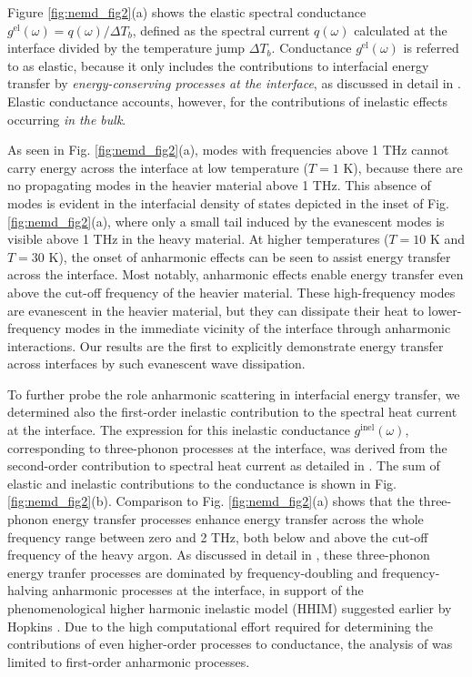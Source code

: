 
Figure \ref{fig:nemd_fig2}(a) shows the elastic spectral conductance $g^{\textrm{el}}(\omega)=q(\omega)/\Delta T_b$, defined as the spectral current $q(\omega)$ calculated at the interface divided by the temperature jump $\Delta T_b$. Conductance $g^{\textrm{el}}(\omega)$ is referred to as elastic, because it only includes the contributions to interfacial energy transfer by \textit{energy-conserving processes at the interface}, as discussed in detail in . Elastic conductance accounts, however, for the contributions of inelastic effects occurring \textit{in the bulk}. 

As seen in Fig. \ref{fig:nemd_fig2}(a), modes with frequencies above 1 THz cannot carry energy across the interface at low temperature ($T=1$ K), because there are no propagating modes in the heavier material above 1 THz. This absence of modes is evident in the interfacial density of states depicted in the inset of Fig. \ref{fig:nemd_fig2}(a), where only a small tail induced by the evanescent modes is visible above 1 THz in the heavy material. At higher temperatures ($T=10$ K and $T=30$ K), the onset of anharmonic effects can be seen to assist energy transfer across the interface. Most notably, anharmonic effects enable energy transfer even above the cut-off frequency of the heavier material. These high-frequency modes are evanescent in the heavier material, but they can dissipate their heat to lower-frequency modes in the immediate vicinity of the interface through anharmonic interactions. Our results are the first to explicitly demonstrate energy transfer across interfaces by such evanescent wave dissipation.

To further probe the role anharmonic scattering in interfacial energy transfer, we determined also the first-order inelastic contribution to the spectral heat current at the interface. The expression for this inelastic conductance $g^{\textrm{inel}}(\omega)$, corresponding to three-phonon processes at the interface, was derived from the second-order contribution to spectral heat current as detailed in . The sum of elastic and inelastic contributions to the conductance is shown in Fig. \ref{fig:nemd_fig2}(b). Comparison to Fig. \ref{fig:nemd_fig2}(a) shows that the three-phonon energy transfer processes enhance energy transfer across the whole frequency range between zero and 2 THz, both below and above the cut-off frequency of the heavy argon. As discussed in detail in , these three-phonon energy tranfer processes are dominated by frequency-doubling and frequency-halving anharmonic processes at the interface, in support of the phenomenological higher harmonic inelastic model (HHIM) suggested earlier by Hopkins \cite{hopkins09_jap}. Due to the high computational effort required for determining the contributions of even higher-order processes to conductance, the analysis of  was limited to first-order anharmonic processes.

